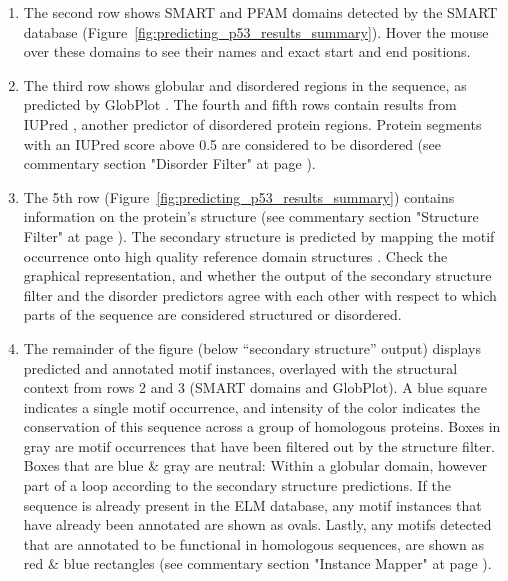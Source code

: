 \documentclass[12pt]{article}
\begin{document}
\begin{enumerate}
	\item The second row shows SMART and PFAM domains detected by the SMART
		database \citep{9600884, 25300481, 9600884}
		(Figure~\ref{fig:predicting_p53_results_summary}). Hover the
		mouse over these domains to see their names and exact start and end
		positions.


	\item The third row shows globular and disordered regions in the
		sequence, as predicted by GlobPlot \citep{12824398}. The fourth
		and fifth rows
		contain results from IUPred \citep{15955779}, another
		predictor of disordered protein regions. Protein segments with
		an IUPred score above 0.5 are considered to be disordered
		(see commentary section "Disorder Filter" at page \pageref{DisorderFilter}).


	\item The 5th row (Figure~\ref{fig:predicting_p53_results_summary}) contains
		information on the protein's structure (see commentary section "Structure Filter" at page \pageref{StructureFilter}). 
		The secondary structure is
		predicted by mapping the motif occurrence onto high quality
		reference domain structures \citep{19852836}. Check the graphical
		representation, and whether the output of the secondary structure filter and
		the disorder predictors agree with each other with respect to which parts of the
		sequence are considered structured or disordered.

	\item The remainder of the figure (below ``secondary structure'' output)
		displays predicted and annotated motif instances, overlayed with the
		structural context from rows 2 and 3 (SMART domains and GlobPlot). A
		blue square indicates a single motif occurrence, and intensity of the
		color indicates the conservation of this sequence across a group of
		homologous proteins.
		Boxes in gray are motif occurrences that have been filtered out by the
		structure filter. Boxes that are blue \& gray are neutral:
		Within a globular domain, however part of a loop
		according to the secondary structure predictions.
		 If the sequence is already present in the ELM database,
		any motif instances that have already been annotated are shown as
		ovals. Lastly, any motifs detected that are annotated to be
		functional in homologous sequences, are shown as red \& blue
		rectangles (see commentary section "Instance Mapper" at page \pageref{InstanceMapper}).


\end{enumerate}
\end{document}
